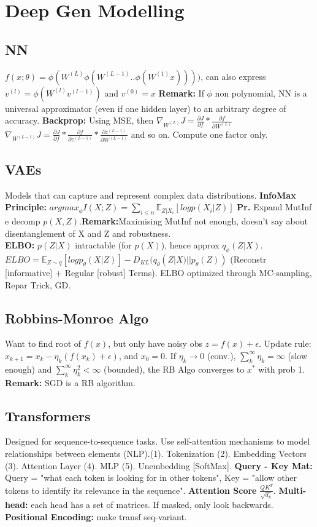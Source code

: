\section*{Deep Gen Modelling}
\subsection*{NN}
$f(x;\theta)=\phi(W^{(L)}\phi(W^{(L-1)}..\phi(W^{(1)}x))))$, can also express $v^{(l)}=\phi(W^{(l)}v^{(l-1)})$ and $v^{(0)}=x$
\textbf{Remark:} If $\phi$ non polynomial, NN is a universal approximator (even if one hidden layer) to an arbitrary degree of accuracy.
\textbf{Backprop:} Using MSE, then $\nabla_{W^{(L)}} J=\frac{\partial J}{\partial f}*\frac{\partial f}{\partial W^{(L)}}$\\
$\nabla_{W^{(L-1)}} J=\frac{\partial J}{\partial f}*\frac{\partial f}{\partial z^{(L-1)}}*\frac{\partial z^{(L-1)}}{\partial W^{(L-1)}}$ and so on. Compute one factor only.

\subsection*{VAEs}
Models that can capture and represent complex data distributions.
\textbf{InfoMax Principle:} $argmax_\phi I(X;Z)=\sum_{i\le n}\mathbb E_{Z|X_i}[log p(X_i|Z)]$ \textbf{Pr.} Expand MutInf e decomp $p(X,Z)$.\textbf{Remark:}Maximising MutInf not enough, doesn't say about disentanglement of X and Z and robustness.\\
\textbf{ELBO:} $p(Z|X)$ intractable (for $p(X)$), hence approx $q_\phi(Z|X)$. $ELBO=\mathbb E_{Z\sim q}[log p_\theta(X|Z)]-D_{KL}(q_\theta(Z|X)||p_\theta(Z))$ (Reconstr [informative] + Regular [robust] Terms). ELBO optimized through MC-sampling, Repar Trick, GD.
\subsection*{Robbins-Monroe Algo}
Want to find root of $f(x)$, but only have noisy obs $z=f(x)+\epsilon$. Update rule: $x_{k+1}=x_k-\eta_k(f(x_k)+\epsilon)$, and $x_0=0$. If $\eta_k\to0$ (conv.), $\sum_k^\infty \eta_k=\infty$ (slow enough) and $\sum_k^\infty \eta_k^2<\infty$ (bounded), the RB Algo converges to $x^*$ with prob 1.
\textbf{Remark:} SGD is a RB algorithm.

\subsection*{Transformers}
Designed for sequence-to-sequence tasks. Use self-attention mechanisms to model relationships between elements (NLP).(1). Tokenization (2). Embedding Vectors (3). Attention Layer (4). MLP (5). Unembedding [SoftMax].
\textbf{Query - Key Mat:} Query = "what each token is looking for in other tokens", Key = "allow other tokens to identify its relevance in the sequence". \textbf{Attention Score} $\frac{QK^T}{\sqrt{d_k}}$. \textbf{Multi-head:} each head has a set of matrices. If masked, only look backwards. \textbf{Positional Encoding:} make transf seq-variant.

